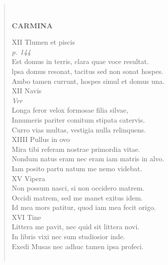 \documentclass[11pt, a4paper]{report}
\begin{document}
\begin{verse}
        ﻿\pagebreak 
     \marginpar{[226]} \begin{center} \textbf{CARMINA} \end{center}XII Tlumen et piscis \\ \textit{p. 144} \\ Est domus in terris, clara quae voce resultat. \\ lpsa domus resonat, tacitus sed non sonat hospes. \\ Ambo tamen currunt, hospes simul et domus una. \\ XII Navis \\ \textit{Vrr} \\ Longa feror velox formosae filia silvae, \\ Innumeris pariter comitum stipata catervis. \\ Curro vias multas, vestigia nulla relinquens. \\ XIIII Pullus in ovo \\ Mira tibi referam nostrae primordia vitae. \\ Nondum natus eram nec eram iam matris in alvo. \\ Iam posito partu natum me nemo videbat. \\ XV Vipera \\ Non possum nasci, si non occidero matrem. \\ Occidi matrem, sed me manet exitus idem. \\ Id mea mors patitur, quod iam mea fecit origo. \\ XVI Tine \\ Littera me pavit, nec quid sit littera novi. \\ In libris vixi nec sum studiosior inde. \\ Exedi Musas nec adhuc tamen ipsa profeci. \\ 
        ﻿\pagebreak 

\end{verse}
\end{document}
